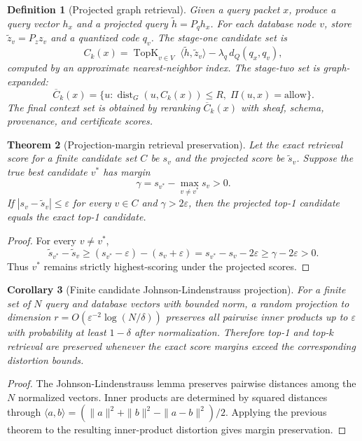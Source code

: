 \documentclass[11pt]{article}
\newtheorem{theorem}{Theorem}[section]
\newtheorem{corollary}[theorem]{Corollary}
\newtheorem{definition}[theorem]{Definition}
\newcommand{\eps}{\varepsilon}
\numberwithin{equation}{section}
\begin{document}
\begin{definition}[Projected graph retrieval]
Given a query packet $x$, produce a query vector $h_x$ and a projected query $\tilde h=P_q h_x$. For each database node $v$, store $\tilde z_v=P_z z_v$ and a quantized code $q_v$. The stage-one candidate set is
\begin{equation}
C_k(x)=\operatorname{TopK}_{v\in V}\;\langle \tilde h,\tilde z_v\rangle -\lambda_q\,d_Q(q_x,q_v),
\end{equation}
computed by an approximate nearest-neighbor index. The stage-two set is graph-expanded:
\begin{equation}
\overline C_k(x)=\{u:\operatorname{dist}_G(u,C_k(x))\le R,\;\Pi(u,x)=\mathrm{allow}\}.
\end{equation}
The final context set is obtained by reranking $\overline C_k(x)$ with sheaf, schema, provenance, and certificate scores.
\end{definition}

\begin{theorem}[Projection-margin retrieval preservation]
Let the exact retrieval score for a finite candidate set $C$ be $s_v$ and the projected score be $\tilde s_v$. Suppose the true best candidate $v^*$ has margin
\begin{equation}
\gamma=s_{v^*}-\max_{v\ne v^*}s_v>0.
\end{equation}
If $|s_v-\tilde s_v|\le\eps$ for every $v\in C$ and $\gamma>2\eps$, then the projected top-1 candidate equals the exact top-1 candidate.
\end{theorem}
\begin{proof}
For every $v\ne v^*$,
\begin{equation}
\tilde s_{v^*}-\tilde s_v\ge (s_{v^*}-\eps)-(s_v+\eps)=s_{v^*}-s_v-2\eps\ge\gamma-2\eps>0.
\end{equation}
Thus $v^*$ remains strictly highest-scoring under the projected scores.
\end{proof}

\begin{corollary}[Finite candidate Johnson-Lindenstrauss projection]
For a finite set of $N$ query and database vectors with bounded norm, a random projection to dimension $r=O(\eps^{-2}\log(N/\delta))$ preserves all pairwise inner products up to $\eps$ with probability at least $1-\delta$ after normalization. Therefore top-1 and top-$k$ retrieval are preserved whenever the exact score margins exceed the corresponding distortion bounds.
\end{corollary}
\begin{proof}
The Johnson-Lindenstrauss lemma preserves pairwise distances among the $N$ normalized vectors. Inner products are determined by squared distances through $\langle a,b\rangle=(\|a\|^2+\|b\|^2-\|a-b\|^2)/2$. Applying the previous theorem to the resulting inner-product distortion gives margin preservation.
\end{proof}
\end{document}
